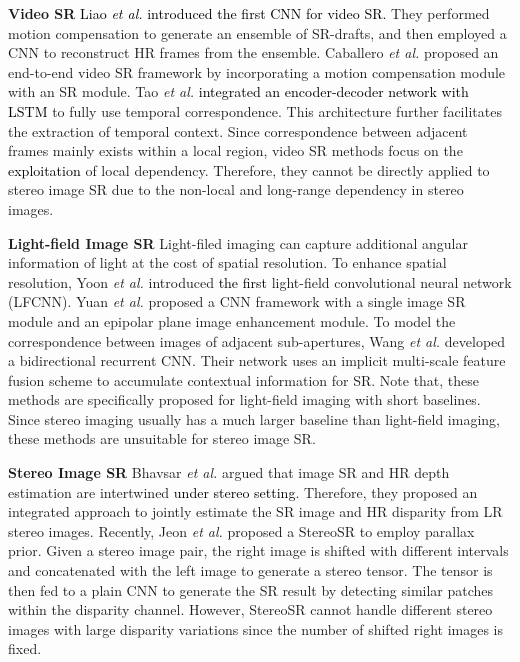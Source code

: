 \documentclass[10pt,twocolumn,letterpaper]{article}
\begin{document}
\noindent 
\textbf{Video SR}
\textcolor{black}{Liao \emph{et al.} \cite{2015-VideoSuperResolutionViaDeepDraftEnsembleLearning-Liao-531-539} introduced the first CNN for video SR.} They performed motion compensation to generate an ensemble of SR-drafts, and then employed a CNN to reconstruct  HR frames from the ensemble. Caballero \emph{et al.} \cite{2017-RealTimeVideoSuperResolutionwithSpatioTemporalNetworksandMotionCompensation-Caballero-2848-2857} proposed an end-to-end video SR framework by incorporating a motion compensation module with an SR module. Tao \emph{et al.} \cite{2017-DetailRevealingDeepVideoSuperResolution-Tao-4482-4490} \textcolor{black}{integrated an encoder-decoder network with LSTM} to fully use temporal correspondence. This architecture further facilitates the extraction of temporal context. Since correspondence between adjacent frames mainly exists within a local region, video SR methods focus on the \textcolor{black}{exploitation} of local dependency. Therefore, they cannot be directly applied to stereo image SR due to the non-local and long-range dependency in stereo images.

\noindent 
\textbf{Light-field Image SR}
Light-filed imaging can capture additional angular information of light at the cost of spatial resolution. To enhance spatial resolution, Yoon \emph{et al.} \cite{2015-LearningaDeepConvolutionalNetworkforLightFieldImageSuperResolution-Yoon-57-65} introduced \textcolor{black}{the first} light-field convolutional neural network (LFCNN). Yuan \emph{et al.} \cite{2018-LightFieldImageSuperresolutionUsingaCombinedDeepCNNBasedonEPI-Yuan-1359-1363a} proposed a CNN framework with a single image SR module and an epipolar plane image enhancement module. To model the correspondence between  images of adjacent sub-apertures, Wang \emph{et al.} \cite{2018-LFNet:aNovelBidirectionalRecurrentConvolutionalNeuralNetworkforLightFieldImageSuperResolution-Wang-4274-4286} developed a bidirectional recurrent CNN. Their network uses an implicit multi-scale feature fusion scheme to accumulate contextual information for SR. Note that, these methods 
are specifically proposed for light-field imaging with short baselines. Since stereo imaging usually has a much larger baseline than light-field imaging, these methods are unsuitable for stereo image SR.


\noindent 
\textbf{Stereo Image SR}
Bhavsar \emph{et al.} \cite{2010-ResolutionEnhancementinMultiImageStereo-Bhavsar-1721-1728} argued that image SR and HR depth estimation are intertwined \textcolor{black}{under stereo setting}. Therefore, they proposed an integrated approach to jointly estimate the SR image and HR disparity from LR stereo images. Recently, Jeon \emph{et al.} \cite{2018-EnhancingtheSpatialResolutionofStereoImagesUsingaParallaxPrior-Jeon--} proposed a StereoSR to employ parallax prior. Given a stereo image pair, the right image is shifted with different intervals and concatenated with the left image to generate a stereo tensor. The tensor is then fed to a plain CNN to generate the SR result by detecting similar patches within the disparity channel. However, StereoSR cannot handle different stereo images with large disparity variations since the number of shifted right images is fixed.
\end{document}
